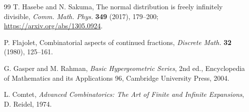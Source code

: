 \documentclass[11pt,oneside]{article}
\theoremstyle{definition}
\theoremstyle{remark}
\begin{document}
\begin{thebibliography}{99}
T. Hasebe and N. Sakuma,
The normal distribution is freely infinitely divisible,
\emph{Comm. Math. Phys.} \textbf{349} (2017), 179--200;
\url{https://arxiv.org/abs/1305.0924}.

P. Flajolet,
Combinatorial aspects of continued fractions,
\emph{Discrete Math.} \textbf{32} (1980), 125--161.

G. Gasper and M. Rahman,
\emph{Basic Hypergeometric Series}, 2nd ed.,
Encyclopedia of Mathematics and its Applications 96,
Cambridge University Press, 2004.

L. Comtet,
\emph{Advanced Combinatorics: The Art of Finite and Infinite Expansions},
D. Reidel, 1974.
\end{thebibliography}
\end{document}
